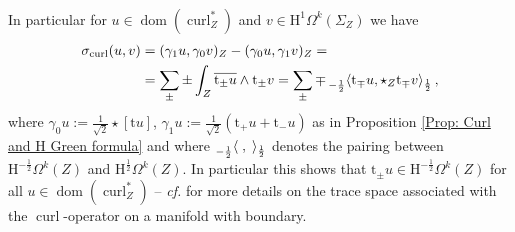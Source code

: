 \begin{Example}
\begin{align}
	\end{align}
	In particular for $u\in\operatorname{dom}(\operatorname{curl}_Z^*)$ and $v\in\mathrm{H}^1\Omega^k(\Sigma_Z)$ we have
	\begin{align}\label{Eqn: simplified form for presymplectic structure}
	\nonumber	\sigma_{\operatorname{curl}}(u,v)&=
		(\gamma_1u,\gamma_0v)_Z-(\gamma_0u,\gamma_1v)_Z=\\&=
		\sum_\pm\pm\int_Z\overline{\mathrm{t}_\pm u}\wedge\mathrm{t}_\pm v=
		\sum_\pm\mp\prescript{}{-\frac{1}{2}}{\langle}\mathrm{t}_\mp u,\star_Z\mathrm{t}_\mp v\rangle_{\frac{1}{2}}\,,
	\end{align}
	where $\gamma_0u:=\frac{1}{\sqrt{2}}\star[\mathrm{t}u]$,
	$\gamma_1u:=\frac{1}{\sqrt{2}}(\mathrm{t}_+u+\mathrm{t}_-u)$ as in Proposition \ref{Prop: Curl and H Green formula} and
	where $\prescript{}{-\frac{1}{2}}{\langle}\;,\;\rangle_{\frac{1}{2}}$ denotes the pairing between $\mathrm{H}^{-\frac{1}{2}}\Omega^k(Z)$ and $\mathrm{H}^{\frac{1}{2}}\Omega^k(Z)$.
	In particular this shows that $\mathrm{t}_\pm u\in\mathrm{H}^{-\frac{1}{2}}\Omega^k(Z)$ for all $u\in\operatorname{dom}(\operatorname{curl}_Z^*)$ -- \textit{cf.} \parencite{Alonso-Valli-96,Buffa-Costabel-Sheen-02,Georgescu-79,Paquet-82,Weck-04} for more details on the trace space associated with the $\operatorname{curl}$-operator on a manifold with boundary.
	

\end{Example}
